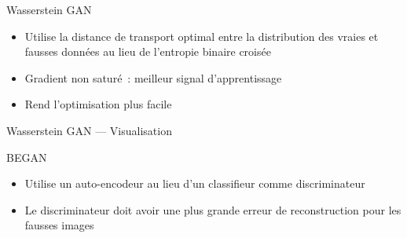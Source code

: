 \begin{frame}{Wasserstein GAN}
  \begin{itemize}[<+->]
    \item Utilise la distance de transport optimal entre la distribution 
          des vraies et fausses données au lieu de l'entropie binaire croisée
    \item Gradient non saturé~: meilleur signal d'apprentissage
    \item Rend l'optimisation plus facile
  \end{itemize}
\end{frame}

\begin{frame}{Wasserstein GAN --- Visualisation}
\end{frame}

\begin{frame}{BEGAN}
  \begin{itemize}[<+->]
    \item Utilise un auto-encodeur au lieu d'un 
          classifieur comme discriminateur
    \item Le discriminateur doit avoir une plus grande erreur de 
          reconstruction pour les fausses images
  \end{itemize}
\end{frame}
